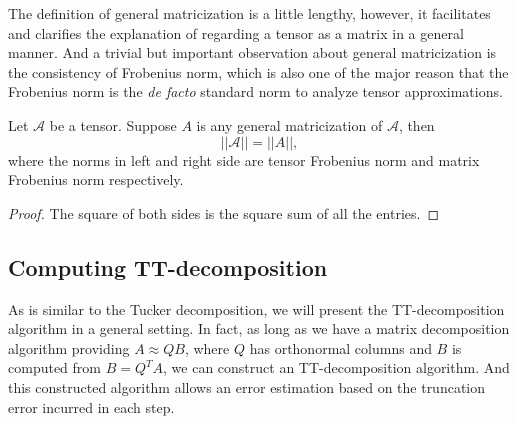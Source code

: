 \documentclass[12pt]{article}
\begin{document}
The definition of general matricization is a little lengthy, however, it facilitates and clarifies the explanation of regarding a tensor as a matrix in a general manner. And a trivial but important observation about general matricization is the consistency of Frobenius norm, which is also one of the major reason that the Frobenius norm is the \textit{de facto} standard norm to analyze tensor approximations.

\begin{myprop}
Let $\mathcal{A}$ be a tensor. Suppose $A$ is any general matricization of $\mathcal{A}$, then
$$ || \mathcal{A} || = || A ||, $$
where the norms in left and right side are tensor Frobenius norm and matrix Frobenius norm respectively.
\end{myprop}
\begin{proof}
The square of both sides is the square sum of all the entries.
\end{proof}

\subsection{Computing TT-decomposition}
As is similar to the Tucker decomposition, we will present the TT-decomposition algorithm in a general setting. In fact, as long as we have a matrix decomposition algorithm providing
$ A \approx QB $, 
where $Q$ has orthonormal columns and $B$ is computed from $B = Q^TA$, we can construct an TT-decomposition algorithm. And this constructed algorithm allows an error estimation based on the truncation error incurred in each step.
\end{document}
